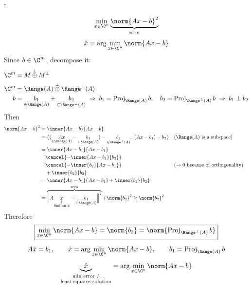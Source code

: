 \paragraph{.}
\[
\min_{x\in\C^n} \underbrace{\norm{Ax-b}^{2}}_{\text{error}}
\]
\[
\hat x = \arg\min_{x\in\C^n}\norm{Ax-b}
\]
Since $b\in\C^m$, decompose it:
\begin{align*}
\C^m &= M\overset{\perp}{\oplus}M^\perp\\
\C^m &= \Range(A)\overset{\perp}{\oplus}\Range^\perp(A)\\
b &= \underset{\in\Range(A)}{b_1} + \underset{\in\Range^\perp(A)}{b_2}
\;\Rightarrow\; b_1 = \operatorname{Proj}_{\Range(A)} b, \quad b_2 = \operatorname{Proj}_{\Range^\perp(A)} b
\;\Rightarrow\; b_1\perp b_2
\end{align*}
Then
\begin{align*}
\norm{Ax-b}^2 &= \inner{Ax-b}{Ax-b}\\
&= \big\langle (\underset{\in\Range(A)}{Ax}-\underset{\in\Range(A)}{b_1}) - \underset{\in\Range^\perp(A)}{b_2},\ (Ax-b_1)-b_2\big\rangle
&& (\Range(A) \text{ is a subspace})\\
&= \inner{Ax-b_1}{Ax-b_1}\\
&\quad \cancel{-\inner{Ax-b_1}{b_2}}\\
&\quad \cancel{-\inner{b_2}{Ax-b_1}} && (\to 0 \text{ because of orthogonality})\\
&\quad +\inner{b_2}{b_2}\\
&= \inner{Ax-b_1}{Ax-b_1} + \inner{b_2}{b_2}\\
&= \overbrace{\Big\lVert A\underset{\substack{\uparrow\\ \text{find an } x}}{x}-\underset{\in\Range(A)}{b_1}\Big\rVert^2}^{\text{zero}} + \norm{b_2}^2 \geq \norm{b_2}^2
\end{align*}
Therefore
\begin{gather*}
\boxed{\min_{x\in\C^n}\norm{Ax-b} = \norm{b_2} = \norm{\operatorname{Proj}_{\Range^\perp(A)} b}}\\[4pt]
A\hat x = b_1, \qquad \hat x = \arg\min_{x\in\C^n}\norm{Ax-b}, \qquad
b_1 = \operatorname{Proj}_{\Range(A)} b\\[4pt]
\underbrace{\hat x}_{\substack{\text{min error /}\\ \text{least squares solution}}} = \arg\min_{x\in\C^n}\norm{Ax-b}
\end{gather*}
